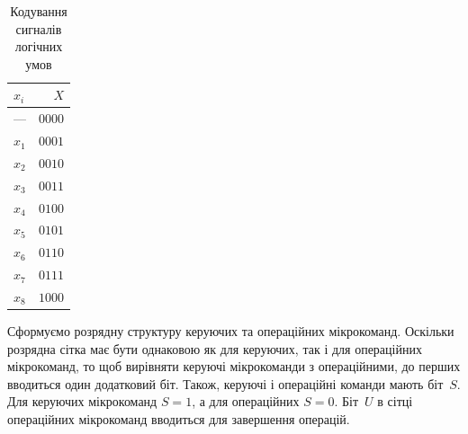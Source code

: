 \documentclass[a4paper,oneside,DIV=12,12pt,headings=normal]{scrartcl}
\begin{document}
			\begin{table}[!htbp]
			\centering
				\begin{tabular}{lr}
					\toprule
						$x_i$ & $X$ \\
					\midrule
						$—$   & $0000$ \\
						$x_1$ & $0001$ \\
						$x_2$ & $0010$ \\
						$x_3$ & $0011$ \\
						$x_4$ & $0100$ \\
						$x_5$ & $0101$ \\
						$x_6$ & $0110$ \\
						$x_7$ & $0111$ \\
						$x_8$ & $1000$ \\
					\bottomrule
				\end{tabular}
			\caption{Кодування сигналів логічних умов}
			\label{}
			\end{table}
			
			Сформуємо розрядну структуру керуючих та операційних мікрокоманд. Оскільки розрядна сітка має бути однаковою як для керуючих, так і для операційних мікрокоманд, то щоб вирівняти керуючі мікрокоманди з операційними, до перших вводиться один додатковий біт. Також, керуючі і операційні команди мають біт~$S$. Для керуючих мікрокоманд $S = 1$, а для операційних $S = 0$. Біт~$U$ в сітці операційних мікрокоманд вводиться для завершення операцій.
			
\end{document}
